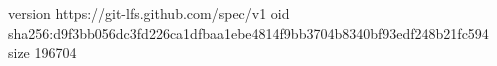 version https://git-lfs.github.com/spec/v1
oid sha256:d9f3bb056dc3fd226ca1dfbaa1ebe4814f9bb3704b8340bf93edf248b21fc594
size 196704
